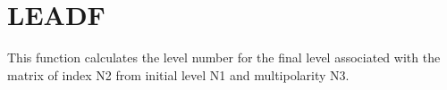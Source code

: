 \section{LEADF}
\label{sect:leadf}

\noindent This function calculates the level number for the final level
associated with the matrix of index N2 from initial level N1 and
multipolarity N3.\\

